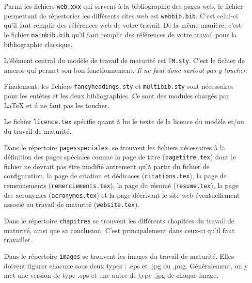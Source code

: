 Parmi les fichiers \verb|web.xxx| qui servent à la bibliographie des pages web, le fichier permettant de répertorier les différents sites web est \verb|webbib.bib|. C'est celui-ci qu'il faut remplir des références web de votre travail. De la même manière, c'est le fichier \verb|mainbib.bib| qu'il faut remplir des références de votre travail pour la bibliographie classique.

L'élément central du modèle de travail de maturité est \verb|TM.sty|. C'est le fichier de macros qui permet son bon fonctionnement. \emph{Il ne faut donc surtout pas y toucher}.

Finalement, les fichiers \verb|fancyheadings.sty| et \verb|multibib.sty| sont nécessaires pour les entêtes et les deux bibliographies. Ce sont des modules chargés par \LaTeX{} et il ne faut pas les toucher.

Le fichier \verb|licence.tex| spécifie quant à lui le texte de la licence du modèle et/ou du travail de maturité.

\bigskip
Dans le répertoire \verb|pagesspeciales|, se trouvent les fichiers nécessaires à la définition des pages spéciales comme la page de titre (\verb|pagetitre.tex|) dont le fichier ne devrait pas être modifié autrement qu'à partir du fichier de configuration, la page de citation et dédicaces (\verb|citations.tex|), la page de remerciements (\verb|remerciements.tex|), la page du résumé (\verb|resume.tex|), la page des acronymes (\verb|acronymes.tex|) et la page décrivant le site web éventuellement associé au travail de maturité (\verb|website.tex|).

Dans le répertoire \verb|chapitres| se trouvent les différents chapitres du travail de maturité, ainsi que sa conclusion. C'est principalement dans ceux-ci qu'il faut travailler.

Dans le répertoire \verb|images| se trouvent les images du travail de maturité. Elles doivent figurer chacune sous deux types : .eps et .jpg ou .png. Généralement, on y met une version de type .eps et une autre de type .jpg de chaque image.

